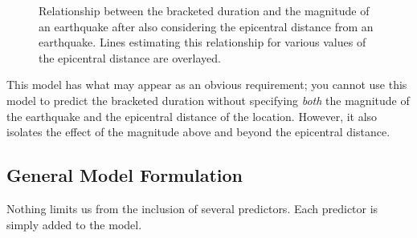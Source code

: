 \documentclass[
  letterpaper,
  DIV=11,
  numbers=noendperiod]{scrreprt}
\theoremstyle{definition}
\theoremstyle{definition}
\theoremstyle{plain}
\theoremstyle{remark}
\begin{document}
\begin{figure}


\caption{\label{fig-regextensions-mlr-plot}Relationship between the
bracketed duration and the magnitude of an earthquake after also
considering the epicentral distance from an earthquake. Lines estimating
this relationship for various values of the epicentral distance are
overlayed.}

\end{figure}%

This model has what may appear as an obvious requirement; you cannot use
this model to predict the bracketed duration without specifying
\emph{both} the magnitude of the earthquake and the epicentral distance
of the location. However, it also isolates the effect of the magnitude
above and beyond the epicentral distance.

\subsection{General Model Formulation}\label{general-model-formulation}

Nothing limits us from the inclusion of several predictors. Each
predictor is simply added to the model.
\end{document}
